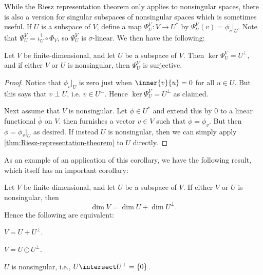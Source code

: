 \documentclass[a4paper, 11pt]{memoir}
\theoremstyle{plaincustomnumber}
\theoremstyle{changedotbreakcustomnumber}
\begin{document}
While the Riesz representation theorem only applies to nonsingular spaces, there is also a version for singular subspaces of nonsingular spaces which is sometimes useful. If $U$ is a subspace of $V$, define a map $\Psi^V_U \colon V \to U^*$ by $\Psi^V_U(v) = \phi_v|_U$. Note that $\Psi^V_U = \iota_U^\dagger \circ \Phi_V$, so $\Psi^V_U$ is $\sigma$-linear. We then have the following:

\begin{corollary}
    \label{thm:Riesz-representation-theorem-for-subspaces}
    Let $V$ be finite-dimensional, and let $U$ be a subspace of $V$. Then $\ker \Psi^V_U = U^\perp$, and if either $V$ or $U$ is nonsingular, then $\Psi^V_U$ is surjective.
\end{corollary}

\begin{proof}
    Notice that $\phi_v|_U$ is zero just when $\inner{v}{u} = 0$ for all $u \in U$. But this says that $v \perp U$, i.e. $v \in U^\perp$. Hence $\ker \Psi^V_U = U^\perp$ as claimed.
    
    Next assume that $V$ is nonsingular. Let $\phi \in U^*$ and extend this by $0$ to a linear functional $\overline{\phi}$ on $V$.  then furnishes a vector $v \in V$ such that $\overline{\phi} = \phi_v$. But then $\phi = \phi_v|_U$ as desired. If instead $U$ is nonsingular, then we can simply apply \cref{thm:Riesz-representation-theorem} to $U$ directly.
\end{proof}
%
As an example of an application of this corollary, we have the following result, which itself has an important corollary:

\begin{proposition}
    \label{prop:nonsingular-space-decomposition}
    Let $V$ be finite-dimensional, and let $U$ be a subspace of $V$. If either $V$ or $U$ is nonsingular, then
    \begin{equation*}
        \dim V
            = \dim U + \dim U^\perp.
    \end{equation*}
    Hence the following are equivalent:
    \begin{enumprop}
        \item $V = U + U^\perp$.
        \item $V = U \odot U^\perp$.
        \item $U$ is nonsingular, i.e., $U \intersect U^\perp = \{0\}$.
    \end{enumprop}
\end{proposition}
\end{document}
